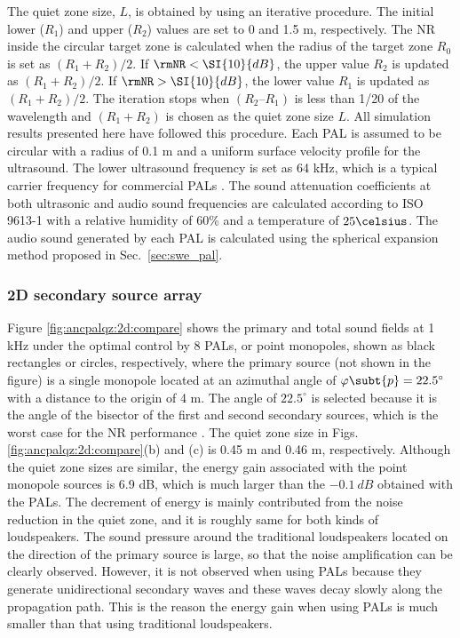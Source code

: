 The quiet zone size, $L$, is obtained by using an iterative procedure. 
The initial lower ($R_1$) and upper ($R_2$) values are set to 0 and 1.5 m, respectively. 
The NR inside the circular target zone is calculated when the radius of the target zone $R_0$ is set as $(R_1 + R_2)/2$. 
If $\rmNR < \SI{10}{dB}$, the upper value $R_2$ is updated as $(R_1 + R_2)/2$. 
If $\rmNR > \SI{10}{dB}$, the lower value $R_1$ is updated as $(R_1 + R_2)/2$. 
The iteration stops when $(R_2 – R_1)$ is less than 1/20 of the wavelength and $(R_1 + R_2)$ is chosen as the quiet zone size $L$. 
All simulation results presented here have followed this procedure. 
Each PAL is assumed to be circular with a radius of 0.1 m and a uniform surface velocity profile for the ultrasound. 
The lower ultrasound frequency is set as 64 kHz, which is a typical carrier frequency for commercial PALs \cite{HolosonicsAudioSpotlight24i}.
The sound attenuation coefficients at both ultrasonic and audio sound frequencies are calculated according to ISO 9613-1 with a relative humidity of 60\% and a temperature of $25\celsius$. 
The audio sound generated by each PAL is calculated using the spherical expansion method proposed in Sec.~\ref{sec:swe_pal}.

\subsubsection{2D secondary source array}
\label{sec:ancpalqz_2d}
Figure \ref{fig:ancpalqz:2d:compare} shows the primary and total sound fields at 1 kHz under the optimal control by 8 PALs, or point monopoles, shown as black rectangles or circles, respectively, where the primary source (not shown in the figure) is a single monopole located at an azimuthal angle of $\varphi\subt{p} = 22.5^\circ$ with a distance to the origin of 4 m. 
The angle of $22.5^\circ$ is selected because it is the angle of the bisector of the first and second secondary sources, which is the worst case for the NR performance \cite{Qiu2019IntroductionVirtualSound}.
The quiet zone size in Figs. \ref{fig:ancpalqz:2d:compare}(b) and (c) is 0.45 m and 0.46 m, respectively. 
Although the quiet zone sizes are similar, the energy gain associated with the point monopole sources is 6.9 dB, which is much larger than the $\SI{-0.1}{dB}$ obtained with the PALs. 
The decrement of energy is mainly contributed from the noise reduction in the quiet zone, and it is roughly same for both kinds of loudspeakers. 
The sound pressure around the traditional loudspeakers located on the direction of the primary source is large, so that the noise amplification can be clearly observed. 
However, it is not observed when using PALs because they generate unidirectional secondary waves and these waves decay slowly along the propagation path. 
This is the reason the energy gain when using PALs is much smaller than that using traditional loudspeakers. 

